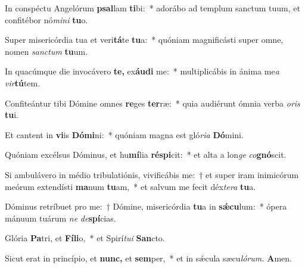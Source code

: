\item In conspéctu Angelórum \textbf{psal}lam \textbf{ti}bi:~* adorábo ad templum sanctum tuum, et confitébor nó\textit{mini} \textbf{tu}o.
\item Super misericórdia tua et veri\textbf{tá}te \textbf{tu}a:~* quóniam magnificásti super omne, nomen \textit{sanctum} \textbf{tu}um.
\item In quacúmque die invocávero \textbf{te,} ex\textbf{áu}\textbf{di} me:~* multiplicábis in ánima me\tinyhspace\textit{a} \textit{vir}\textbf{tú}tem.
\item Confiteántur tibi Dómine omnes \textbf{re}ges \textbf{ter}ræ:~* quia audiérunt ómnia verba \textit{oris} \textbf{tu}i.
\item Et cantent in \textbf{vi}is \textbf{Dó}\textbf{mi}ni:~* quóniam magna est gló\textit{ria} \textbf{Dó}mini.
\item Quóniam excélsus Dóminus, et hu\textbf{mí}lia \textbf{ré}\textbf{spi}cit:~* et alta a lon\textit{ge} \textit{co}\textbf{gnó}scit.
\item Si ambulávero in médio tribulatiónis, vivificábis me:~† et super iram inimicórum meórum extendísti \textbf{ma}num \textbf{tu}am,~* et salvum me fecit déx\hspace*{0.01em}\textit{tera} \textbf{tu}a.
\item Dóminus retríbuet pro me:~† Dómine, misericórdia \textbf{tu}a in \textbf{sǽ}\textbf{cu}lum:~* ópera mánuum tuárum \textit{ne} \textit{de}\textbf{spí}cias.
\item Glória \textbf{Pa}tri, et \textbf{Fí}\textbf{li}o,~* et Spirí\tinyhspace\textit{tui} \textbf{San}cto.
\item Sicut erat in princípio, et \textbf{nunc,} et \textbf{sem}per,~* et in sǽcula sæcu\tinyhspace\textit{lórum.} \textbf{A}men.